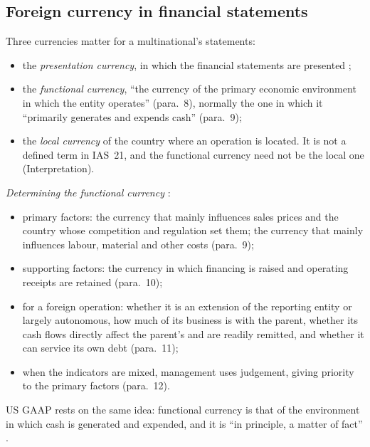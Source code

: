 \subsection{Foreign currency in financial statements}

\begin{qfdefinition}\label{def:functional-currency-transactions}
 Three currencies matter for a multinational's statements:
\begin{itemize}
\item the \emph{presentation currency}, in which the financial statements are presented \citep[para.~8]{eu-2023-1803-ias21};
\item the \emph{functional currency}, ``the currency of the primary economic environment in which the entity operates'' (para.~8), normally the one in which it ``primarily generates and expends cash'' (para.~9);
\item the \emph{local currency} of the country where an operation is located. It is not a defined term in IAS~21, and the functional currency need not be the local one (Interpretation).
\end{itemize}

\emph{Determining the functional currency} \citep[paras.~9--12]{eu-2023-1803-ias21}:
\begin{itemize}
\item primary factors: the currency that mainly influences sales prices and the country whose competition and regulation set them; the currency that mainly influences labour, material and other costs (para.~9);
\item supporting factors: the currency in which financing is raised and operating receipts are retained (para.~10);
\item for a foreign operation: whether it is an extension of the reporting entity or largely autonomous, how much of its business is with the parent, whether its cash flows directly affect the parent's and are readily remitted, and whether it can service its own debt (para.~11);
\item when the indicators are mixed, management uses judgement, giving priority to the primary factors (para.~12).
\end{itemize}
US GAAP rests on the same idea: functional currency is that of the environment in which cash is generated and expended, and it is ``in principle, a matter of fact'' \citep[para.~39]{us-foreign-currency-1981}.


\end{qfdefinition}
